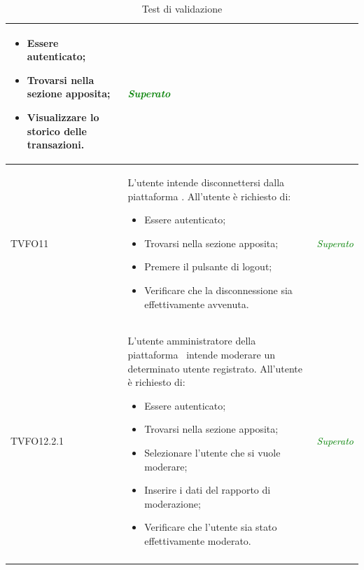 \begin{longtable}{|>{\centering\arraybackslash}p{2.3cm}|>{\centering\arraybackslash}p{7.5cm} | >{\centering\arraybackslash}p{4cm}|}
\begin{itemize}
			\item Essere autenticato;
			\item Trovarsi nella sezione apposita;
			\item Visualizzare lo storico delle transazioni.
		\end{itemize} & \textcolor{Green}{\textit{Superato}}\\ \hline		
		\hypertarget{TVFO11}{TVFO11} & L’utente intende disconnettersi dalla piattaforma \progetto. All’utente è richiesto di:
		\begin{itemize}
			\item Essere autenticato;
			\item Trovarsi nella sezione apposita;
			\item Premere il pulsante di logout;
			\item Verificare che la disconnessione sia effettivamente avvenuta.
		\end{itemize}
		& \textcolor{Green}{\textit{Superato}}\\ \hline
		\hypertarget{TVFO12.2.1}{TVFO12.2.1} & L’utente amministratore della piattaforma \progetto\ intende moderare un determinato utente registrato. All’utente è richiesto di:
		\begin{itemize}
			\item Essere autenticato;
			\item Trovarsi nella sezione apposita;
			\item Selezionare l'utente che si vuole moderare;
			\item Inserire i dati del rapporto di moderazione;
			\item Verificare che l'utente sia stato effettivamente moderato.
		\end{itemize} & \textcolor{Green}{\textit{Superato}}\\ \hline
		\caption[Test di validazione]{Test di validazione}
		\label{tabella:test4}
	\end{longtable}

